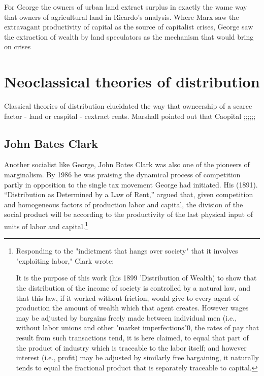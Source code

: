 For George the owners of urban land extract surplus in exactly the wame way that owners of agricultural land in Ricardo's analysis. Where Marx saw  the extravagant productivity of capital  as the source of capitalist crises, George saw the extraction of wealth by land speculators as the mechanism that would bring on crises

  
  
\section{Neoclassical theories of distribution}
Classical theories of distribution elucidated the way that owneership of a scarce factor - land or caspital - cextract rents. Marshall pointed out that Caopital ;;;;;;


  \subsection{John Bates Clark}
  Another socialist like George, John Bates Clark was also one of the pioneers of marginalism. By 1986 he was praising the dynamical process of competition partly in opposition to the single tax movement George had initiated.  His (1891). ``Distribution as Determined by a Law of Rent,'' argued that, given  competition and homogeneous factors of production labor and capital, the division of the social product will be according to the productivity of the last physical input of units of labor and capital.\footnote{Responding to the "indictment that hangs over society" that it involves "exploiting labor," Clark wrote:

    It is the purpose of this work (his 1899 'Distribution of Wealth) to show that the distribution of the income of society is controlled by a natural law, and that this law, if it worked without friction, would give to every agent of production the amount of wealth which that agent creates. However wages may be adjusted by bargains freely made between individual men (i.e., without labor unions and other "market imperfections"0, the rates of pay that result from such transactions tend, it is here claimed, to equal that part of the product of industry which is traceable to the labor itself; and however interest (i.e., profit) may be adjusted by similarly free bargaining, it naturally tends to equal the fractional product that is separately traceable to capital.} 
  
